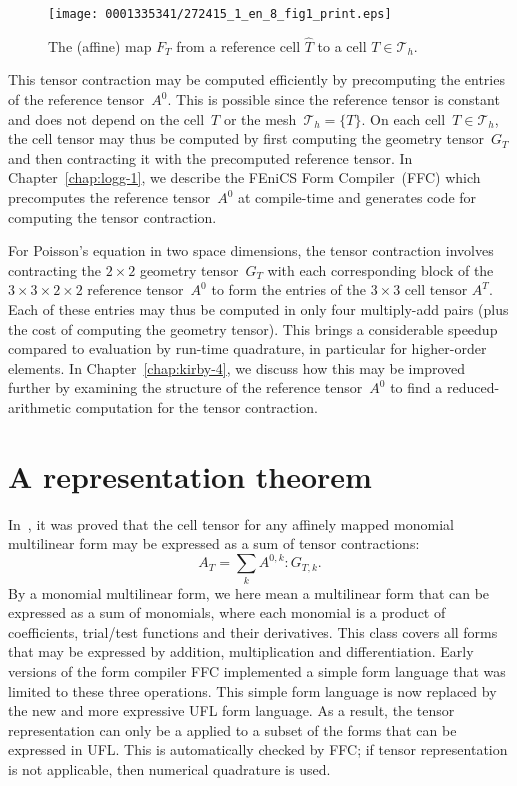\begin{figure}
\bwfig
\centering
\texttt{[image: 0001335341/272415\_1\_en\_8\_fig1\_print.eps]}
  \caption{The (affine) map $F_T$ from a reference cell $\hat{T}$
    to a cell $T \in \mathcal{T}_h$.}
  \label{fig:affinemap}\vspace*{6pt}
\end{figure}

This tensor contraction may be computed efficiently by precomputing
the entries of the reference tensor~$A^0$. This is possible since the
reference tensor is constant and does not depend on the cell~$T$ or
the mesh~$\mathcal{T}_h = \{T\}$. On each cell~$T \in \mathcal{T}_h$,
the cell tensor may thus be computed by first computing the geometry
tensor~$G_T$ and then contracting it with the precomputed reference
tensor. In Chapter~\ref{chap:logg-1}, we describe the FEniCS Form
Compiler~(FFC) which precomputes the reference tensor~$A^0$ at
compile-time and generates code for computing the tensor contraction.

For Poisson's equation in two space dimensions, the tensor contraction
involves contracting the $2 \times 2$ geometry tensor~$G_T$ with each
corresponding block of the $3 \times 3 \times 2 \times 2$ reference
tensor~$A^0$ to form the entries of the $3 \times 3$ cell tensor
$A^T$. Each of these entries may thus be computed in only four
multiply-add pairs (plus the cost of computing the geometry
tensor). This brings a considerable speedup compared to evaluation by
run-time quadrature, in particular for higher-order elements. In
Chapter~\ref{chap:kirby-4}, we discuss how this may be improved
further by examining the structure of the reference tensor~$A^0$ to
find a reduced-arithmetic computation for the tensor contraction.

\section{A representation theorem}

In~\citet{KirbyLogg2006}, it was proved that the cell tensor for any
affinely mapped monomial multilinear form may be expressed as a sum
of tensor contractions:
\begin{equation} \label{eq:tensorcontraction}
  A_T = \sum_k A^{0,k} : G_{T,k}.
\end{equation}
By a monomial multilinear form, we here mean a multilinear form that
can be expressed as a sum of monomials, where each monomial is a
product of coefficients, trial/test functions and their derivatives.
This class covers all forms that may be expressed by addition,
multiplication and differentiation. Early versions of the form
compiler FFC implemented a simple form language that was limited to
these three operations. This simple form language is now replaced by
the new and more expressive UFL form language. As a result, the tensor
representation can only be a applied to a subset of the forms that
can be expressed in UFL. This is automatically checked by FFC; if tensor
representation is not applicable, then numerical quadrature is used.

